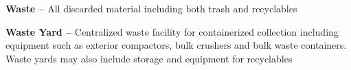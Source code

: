 \textbf{Waste --} All discarded material including both trash and recyclables

\textbf{Waste Yard --} Centralized waste facility for containerized collection including equipment such as exterior compactors, bulk crushers and bulk waste containers. Waste yards may also include storage and equipment for recyclables

